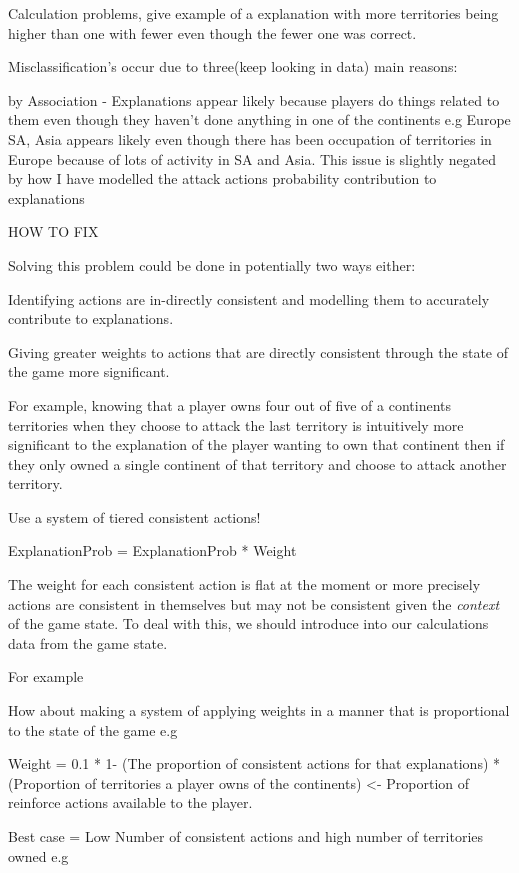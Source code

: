 \documentclass[parskip]{cs4rep}
\begin{document}
Calculation problems, give example of a explanation with more territories being higher than one with fewer even though the fewer one was correct.

Misclassification's occur due to three(keep looking in data) main reasons:

by Association - Explanations appear likely because players do things related to them even though they haven't done anything in one of the continents e.g Europe SA, Asia appears likely even though there has been occupation of territories in Europe because of lots of activity in SA and Asia. This issue is slightly negated by how I have modelled the attack actions probability contribution to explanations

HOW TO FIX

Solving this problem could be done in potentially two ways either:

Identifying actions are in-directly consistent and modelling them to accurately contribute to explanations.
 
Giving greater weights to actions that are directly consistent through the state of the game  more significant.

For example, knowing that a player owns four out of five of a continents territories when they choose to attack the last territory is intuitively more significant to the explanation of the player wanting to own that continent then if they only owned a single continent of that territory and choose to attack another territory.

Use a system of tiered consistent actions!

ExplanationProb = ExplanationProb * Weight

The weight for each consistent action is flat at the moment or more precisely actions are consistent in themselves but may not be consistent given the \textit{context} of the game state. To deal with this, we should introduce into our calculations data from the game state.

For example

How about making a system of applying weights in a manner that is proportional to the state of the game e.g

Weight = 0.1 * 1- (The proportion of consistent actions for that explanations) * (Proportion of territories a player owns of the continents) <- Proportion of reinforce actions available to the player.

Best case = Low Number of consistent actions and high number of territories owned e.g
\end{document}
